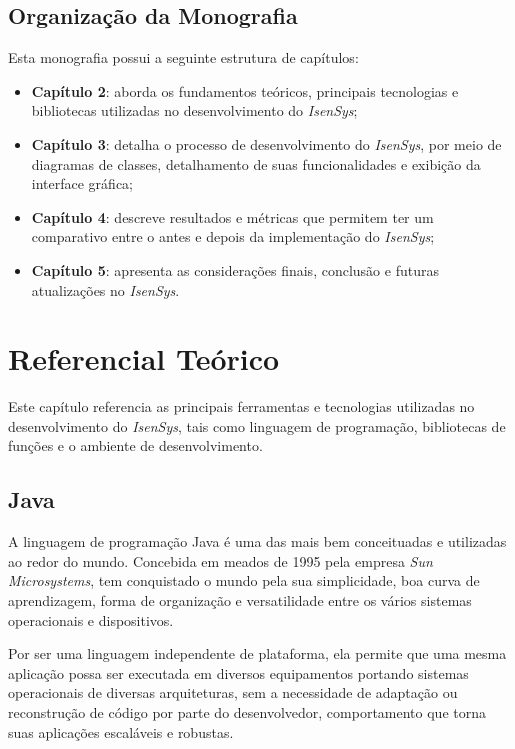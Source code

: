 \documentclass[
	12pt,			%
	openright,		%
	oneside,	
	a4paper,		%
	english,		%
	brazil			%
]{abntex2/abntex2}  %
\begin{document}
		\section{Organização da Monografia}
		
			Esta monografia possui a seguinte estrutura de capítulos:
			
			\begin{itemize}
				
				\item \textbf{Capítulo 2}: aborda os fundamentos teóricos, principais tecnologias e bibliotecas utilizadas no desenvolvimento do \textit{IsenSys};
				\item \textbf{Capítulo 3}: detalha o processo de desenvolvimento do \textit{IsenSys}, por meio de diagramas de classes, detalhamento de suas funcionalidades e exibição da interface gráfica;
				\item \textbf{Capítulo 4}: descreve resultados e métricas que permitem ter um comparativo entre o antes e depois da implementação do \textit{IsenSys};
				\item \textbf{Capítulo 5}: apresenta as considerações finais, conclusão e futuras atualizações no \textit{IsenSys}.
				
			\end{itemize}
	
	\chapter{Referencial Teórico} \label{cap2-referencial}
	
		Este capítulo referencia as principais ferramentas e tecnologias utilizadas no desenvolvimento do \textit{IsenSys}, tais como linguagem de programação, bibliotecas de funções e o ambiente de desenvolvimento.
		
		\section{Java} \label{java}
		
			A linguagem de programação Java \cite{java} é uma das mais bem conceituadas e utilizadas ao redor do mundo. Concebida em meados de 1995 pela empresa \textit{Sun Microsystems}, tem conquistado o mundo pela sua simplicidade, boa curva de aprendizagem, forma de organização e versatilidade entre os vários sistemas operacionais e dispositivos.
		
			Por ser uma linguagem independente de plataforma, ela permite que uma mesma aplicação possa ser executada em diversos equipamentos portando sistemas operacionais de diversas arquiteturas, sem a necessidade de adaptação ou reconstrução de código por parte do desenvolvedor, comportamento que torna suas aplicações escaláveis e robustas.
		
\end{document}
